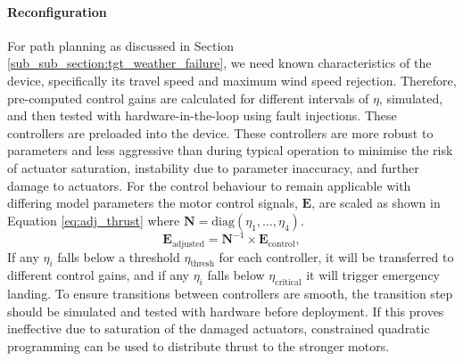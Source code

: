 \paragraph{Reconfiguration}
For path planning as discussed in Section \ref{sub_sub_section:tgt_weather_failure}, we need known characteristics of the device, specifically its travel speed and maximum wind speed rejection. Therefore, pre-computed control gains are calculated for different intervals of $\eta$, simulated, and then tested with hardware-in-the-loop using fault injections. These controllers are preloaded into the device. These controllers are more robust to parameters and less aggressive than during typical operation to minimise the risk of actuator saturation, instability due to parameter inaccuracy, and further damage to actuators. For the control behaviour to remain applicable with differing model parameters the motor control signals, $\mathbf{E}$, are scaled as shown in Equation \ref{eq:adj_thrust} where $\mathbf{N} = \text{diag}(\eta_1, \dots,\eta_4)$.
\begin{equation}\label{eq:adj_thrust}
    \mathbf{E}_{\text{adjusted}} = \mathbf{N}^{-1}\times \mathbf{E}_{\text{control}}, 
\end{equation}
If any $\eta_i$ falls below a threshold $\eta_{\text{thresh}}$ for each controller, it will be transferred to different control gains, and if any $\eta_i$ falls below $\eta_{\text{critical}}$ it will trigger emergency landing. To ensure transitions between controllers are smooth, the transition step should be simulated and tested with hardware before deployment. If this proves ineffective due to saturation of the damaged actuators, constrained quadratic programming can be used \cite{JOHANSEN2013} to distribute thrust to the stronger motors.

